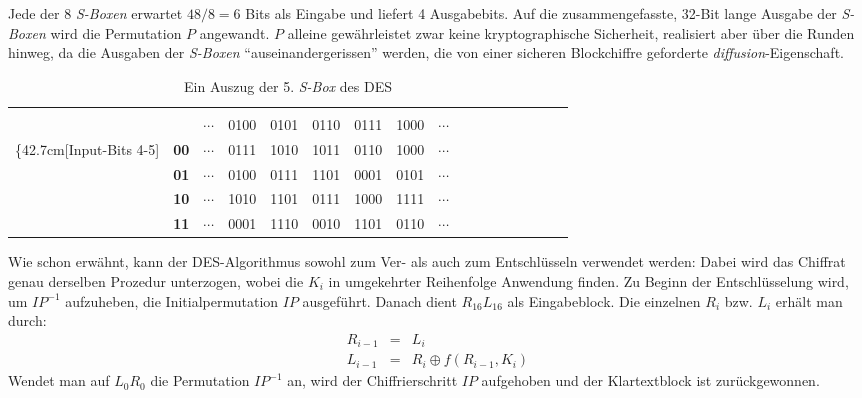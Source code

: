 Jede der 8 \textit{S-Boxen} erwartet $48 / 8 = 6$ Bits als Eingabe und liefert 4 Ausgabebits. Auf die zusammengefasste, 32-Bit lange Ausgabe der \textit{S-Boxen} wird die Permutation $P$ angewandt. $P$ alleine gewährleistet zwar keine kryptographische Sicherheit, realisiert aber über die Runden hinweg, da die Ausgaben der \textit{S-Boxen} "`auseinandergerissen"' werden, die von einer sicheren Blockchiffre geforderte \textit{diffusion}-Eigenschaft.

\begin{table}[h]
	\hspace{-0.5cm}
	\begin{tabularx}{0.8\textwidth}{ r | >{\bfseries}Br | Cc | Cc | Cc | Cc | Cc | Cc | Cc |} 
		&  \\
		& &  \textbf{ $\cdots$ } & \rowstyle{\bfseries}0100 & 0101 & 0110 & 0111 & 1000 & \textbf{$\cdots$} \\ 
		\ldelim\{{4}{2.7cm}[Input-Bits 4-5]
		& 00 & $\cdots$ & 0111 & 1010 & 1011 & 0110 & 1000 & $\cdots$ \\ 
		& 01 & $\cdots$ & 0100 & 0111 & 1101 & 0001 & 0101 & $\cdots$ \\ 
		& 10 & $\cdots$ & 1010 & 1101 & 0111 & 1000 & 1111 & $\cdots$ \\ 
		& 11 & $\cdots$ & 0001 & 1110 & 0010 & 1101 & 0110 & $\cdots$ \\
	\end{tabularx}
	\caption{Ein Auszug der 5. \textit{S-Box} des DES}
	\label{ssec:des:tbl:s-box}
\end{table}

Wie schon erwähnt, kann der DES-Algorithmus sowohl zum Ver- als auch zum Entschlüsseln verwendet werden: Dabei wird das Chiffrat genau derselben Prozedur unterzogen, wobei die $K_i$ in umgekehrter Reihenfolge Anwendung finden. Zu Beginn der Entschlüsselung wird, um $IP^{-1}$ aufzuheben, die Initialpermutation $IP$ ausgeführt. Danach dient $R_{16}L_{16}$ als Eingabeblock. Die einzelnen $R_i$ bzw. $L_i$ erhält man durch:
\begin{eqnarray*}
	R_{i-1}	& = 	& L_i \\
	L_{i-1}	& = 	& R_i \oplus f(R_{i-1}, K_i)
\end{eqnarray*}
Wendet man auf $L_0R_0$ die Permutation $IP^{-1}$ an, wird der Chiffrierschritt $IP$ aufgehoben und der Klartextblock ist zurückgewonnen.

